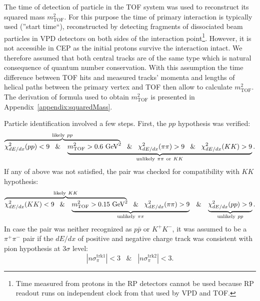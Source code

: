 %
The time of detection of particle in the TOF system was used to reconstruct its squared mass $m^{2}_{\text{TOF}}$. For this purpose the time of primary interaction is typically used (''start time``), reconstructed by detecting fragments of dissociated beam particles in VPD detectors on both sides of the interaction point\footnote{Time measured from protons in the RP detectors cannot be used because RP readout runs on independent clock from that used by VPD and TOF.}. However, it is not accessible in CEP as the initial protons survive the interaction intact. We therefore assumed that both central tracks are of the same type which is natural consequence of quantum number conservation. With this assumption the time difference between TOF hits and measured tracks' momenta and lengths of helical paths between the primary vertex and TOF then allow to calculate $m^{2}_{\text{TOF}}$. The derivation of formula used to obtain $m^{2}_{\text{TOF}}$ is presented in Appendix~\ref{appendix:squaredMass}.

Particle identification involved a few steps. First, the $pp$ hypothesis was verified:
\begin{equation}\label{eq:pidPPbar}\lefteqn{\overbrace{\phantom{\chi^{2}_{dE/dx}(pp)<9\;\;\; \& \;\;\; m^{2}_{\text{TOF}} > 0.6~\mbox{GeV}^{2}}}^{\text{likely}~pp}}\chi^{2}_{dE/dx}(pp)<9\;\;\; \& \;\;\; \underbrace{m^{2}_{\text{TOF}} > 0.6~\mbox{GeV}^{2}\;\;\; \& \;\;\; \chi^{2}_{dE/dx}(\pi\pi)>9\;\;\; \& \;\;\; \chi^{2}_{dE/dx}(KK)>9}_{\text{unlikely}~\pi\pi~\text{or}~KK}.\end{equation}
If any of above was not satisfied, the pair was checked for compatibility with $KK$ hypothesis:
%
\begin{equation}\label{eq:pidKK}%
\lefteqn{\overbrace{\phantom{\chi^{2}_{dE/dx}(KK)<9\;\;\; \& \;\;\; m^{2}_{\text{TOF}} > 0.15~\mbox{GeV}^{2}}}^{\text{likely}~KK}}\chi^{2}_{dE/dx}(KK)<9\;\;\; \& \;\;\; \underbrace{m^{2}_{\text{TOF}} > 0.15~\mbox{GeV}^{2}\;\;\; \& \;\;\; \chi^{2}_{dE/dx}(\pi\pi)>9}_{\text{unlikely}~\pi\pi}\;\;\; \& \;\;\; \underbrace{\chi^{2}_{dE/dx}(pp)>9}_{\text{unlikely}~pp}.
\end{equation}
%
In case the pair was neither recognized as $p\bar{p}$ or $K^{+}K^{-}$, it was assumed to be a $\pi^{+}\pi^{-}$ pair if the $dE/dx$ of positive and negative charge track was consistent with pion hypothesis at $3\sigma$ level:
\begin{equation}\label{eq:pidPiPi}|n\sigma_{\pi}^{\text{trk1}}|<3\;\;\; \& \;\;\; |n\sigma_{\pi}^{\text{trk2}}|<3.\end{equation}




